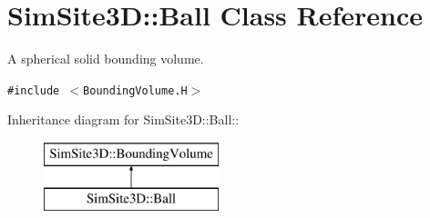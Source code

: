 \section{SimSite3D::Ball Class Reference}
\label{classSimSite3D_1_1Ball}
A spherical solid bounding volume.  


{\tt \#include $<$Bounding\-Volume.H$>$}

Inheritance diagram for SimSite3D::Ball::\begin{figure}[H]
\begin{center}
\leavevmode
\includegraphics[height=2cm]{classSimSite3D_1_1Ball}
\end{center}
\end{figure}
